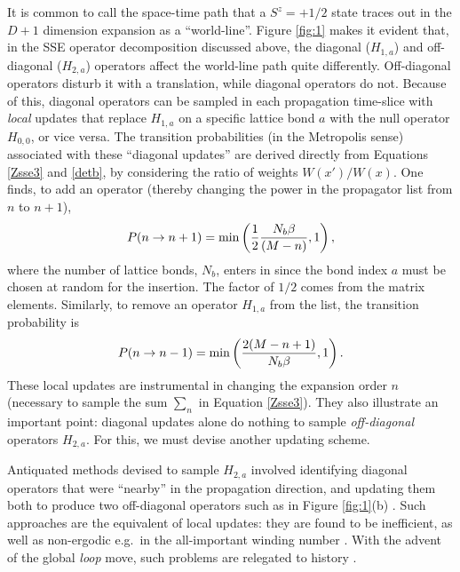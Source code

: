 \documentclass[vecphys]{svmult}
\begin{document}
It is common to call the space-time path that a $S^z=+1/2$ state traces out in the $D+1$ dimension expansion as a ``world-line''.  Figure \ref{fig:1} makes it evident that, in the SSE operator decomposition discussed above, the diagonal ($H_{1,a}$) and off-diagonal ($H_{2,a}$) operators affect the world-line path quite differently.  Off-diagonal operators disturb it with a translation, while diagonal operators do not.  Because of this, diagonal operators can be sampled in each propagation time-slice with {\em local} updates that replace $H_{1,a}$ on a specific lattice bond $a$ with the null operator $H_{0,0}$, or vice versa.  The transition probabilities (in the Metropolis sense) associated with these ``diagonal updates'' are derived directly from Equations \ref{Zsse3} and \ref{detb}, by considering the ratio of weights $W(x')/W(x)$.  One finds,
to add an operator (thereby changing the power in the propagator list from $n$ to $n+1$),
\begin{eqnarray}
P(n \rightarrow n+1) = {\rm min} \left({ \frac{1}{2}\frac{N_b \beta}{(M-n)}, 1 }\right),
\end{eqnarray}
where the number of lattice bonds, $N_b$, enters in since the bond index $a$ must be chosen at random for the insertion.  The factor of $1/2$ comes from the matrix elements.  Similarly, to remove an operator $H_{1,a}$ from the list, the transition probability is
\begin{eqnarray}
P(n \rightarrow n-1) = {\rm min} \left({ \frac{2(M-n+1)}{N_b \beta}, 1 }\right).
\end{eqnarray}
These local updates are instrumental in changing the expansion order $n$ (necessary to sample the sum $\sum_n$ in Equation \ref{Zsse3}).  They also illustrate an important point: diagonal updates alone do nothing to sample {\em off-diagonal} operators $H_{2,a}$.  For this, we must devise another updating scheme.

Antiquated methods devised to sample $H_{2,a}$ involved identifying diagonal operators that were ``nearby'' in the propagation direction, and updating them both to produce two off-diagonal operators such as in Figure \ref{fig:1}(b) \cite{Melko:SandvikHeis}.  Such approaches are the equivalent of local updates: they are found to be inefficient, as well as non-ergodic e.g.~in the all-important winding number \cite{Melko:PC}.  With the advent of the global {\it loop} move, such problems are relegated to history \cite{Melko:Sandvik99,Melko:Syljuasen02}.  
\end{document}
